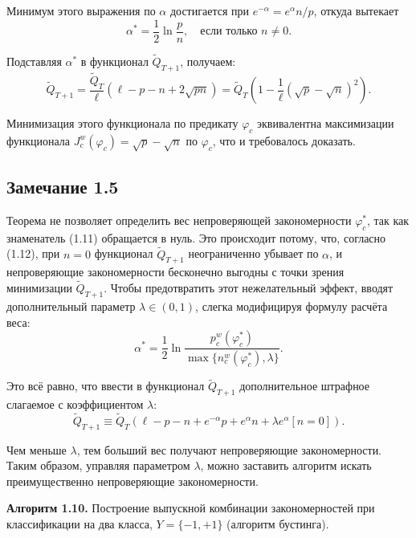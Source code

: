 \begin{itemize}
Минимум этого выражения по $\alpha$ достигается при $e^{-\alpha} = e^\alpha n / p$, откуда вытекает 
\begin{equation}
    \alpha^* = \frac{1}{2} \ln \frac{p}{n}, \quad \text{если только } n \neq 0.
\end{equation}

Подставляя $\alpha^*$ в функционал $\tilde{Q}_{T+1}$, получаем:
\begin{equation}
    \tilde{Q}_{T+1} = \frac{\tilde{Q}_T}{\ell} \left( \ell - p - n + 2 \sqrt{p n} \right) = \tilde{Q}_T \left( 1 - \frac{1}{\ell} \left( \sqrt{p} - \sqrt{n} \right)^2 \right).
\end{equation}

Минимизация этого функционала по предикату $\varphi_c$ эквивалентна максимизации функционала $J_c^w(\varphi_c) = \sqrt{p} - \sqrt{n}$ по $\varphi_c$, что и требовалось доказать.

\subsection*{Замечание 1.5}

Теорема не позволяет определить вес непроверяющей закономерности $\varphi_c^*$, так как знаменатель (1.11) обращается в нуль. Это происходит потому, что, согласно (1.12), при $n = 0$ функционал $\tilde{Q}_{T+1}$ неограниченно убывает по $\alpha$, и непроверяющие закономерности бесконечно выгодны с точки зрения минимизации $\tilde{Q}_{T+1}$. Чтобы предотвратить этот нежелательный эффект, вводят дополнительный параметр $\lambda \in (0, 1)$, слегка модифицируя формулу расчёта веса:
\begin{equation}
    \alpha^* = \frac{1}{2} \ln \frac{p_c^w(\varphi_c^*)}{\max\{n_c^w(\varphi_c^*), \lambda\}}.
\end{equation}

Это всё равно, что ввести в функционал $\tilde{Q}_{T+1}$ дополнительное штрафное слагаемое с коэффициентом $\lambda$:
\begin{equation}
    \tilde{Q}_{T+1} \equiv \tilde{Q}_T \left( \ell - p - n + e^{-\alpha} p + e^\alpha n + \lambda e^\alpha \left[ n = 0 \right] \right).
\end{equation}

Чем меньше $\lambda$, тем больший вес получают непроверяющие закономерности. Таким образом, управляя параметром $\lambda$, можно заставить алгоритм искать преимущественно непроверяющие закономерности.

\textbf{Алгоритм 1.10.} Построение выпускной комбинации закономерностей при классификации на два класса, $Y = \{-1, +1\}$ (алгоритм бустинга).


\end{itemize}

